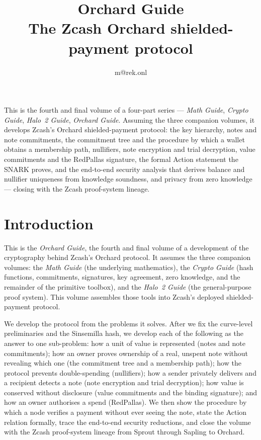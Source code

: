 \documentclass[11pt,a4paper]{article}
\title{\textbf{\Huge Orchard Guide}\\[6pt]\large The Zcash Orchard shielded-payment protocol}
\author{m@rek.onl}
\date{}
\theoremstyle{definition}
\renewenvironment{abstract}{%
  \small\begin{center}{\bfseries\abstractname}\end{center}\medskip\noindent\ignorespaces
}{\par\medskip}
\begin{document}
\maketitle
\thispagestyle{empty}
\begin{abstract}
This is the fourth and final volume of a four-part series --- \emph{Math Guide}, \emph{Crypto Guide}, \emph{Halo~2 Guide}, \emph{Orchard Guide}. Assuming the three companion volumes, it develops Zcash's Orchard shielded-payment protocol: the key hierarchy, notes and note commitments, the commitment tree and the procedure by which a wallet obtains a membership path, nullifiers, note encryption and trial decryption, value commitments and the RedPallas signature, the formal Action statement the SNARK proves, and the end-to-end security analysis that derives balance and nullifier uniqueness from knowledge soundness, and privacy from zero knowledge --- closing with the Zcash proof-system lineage.
\end{abstract}
\clearpage
\tableofcontents
\clearpage

\section{Introduction}\label{sec:intro}
This is the \emph{Orchard Guide}, the fourth and final volume of a development of the cryptography
behind Zcash's Orchard protocol. It assumes the three companion volumes: the \emph{Math Guide}
(the underlying mathematics), the \emph{Crypto Guide} (hash functions, commitments, signatures,
key agreement, zero knowledge, and the remainder of the primitive toolbox), and the \emph{Halo~2 Guide}
(the general-purpose proof system). This volume assembles those tools into Zcash's deployed
shielded-payment protocol.

We develop the protocol from the problems it solves. After
we fix the curve-level preliminaries and the Sinsemilla hash, we develop each of the following
as the answer to one sub-problem: how a unit of value is represented (notes and note commitments); how
an owner proves ownership of a real, unspent note without revealing which one (the commitment tree and a
membership path); how the protocol prevents double-spending (nullifiers); how
a sender privately delivers and a recipient detects a note (note encryption and trial decryption); how value
is conserved without disclosure (value commitments and the binding signature); and how an owner authorises a
spend (RedPallas). We then
show the procedure by which a node verifies a payment without ever seeing the
note, state the Action relation formally, trace the end-to-end security reductions, and close the volume with the Zcash
proof-system lineage from Sprout through Sapling to Orchard.
\end{document}
